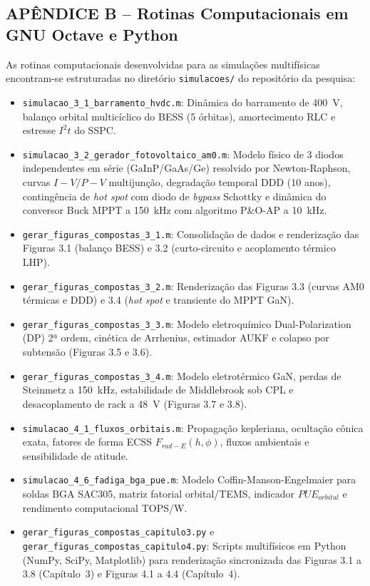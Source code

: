 \vspace{0.8cm}
\subsection*{APÊNDICE B -- Rotinas Computacionais em GNU Octave e Python}

As rotinas computacionais desenvolvidas para as simulações multifísicas encontram-se estruturadas no diretório \texttt{simulacoes/} do repositório da pesquisa:
\begin{itemize}[noitemsep,topsep=2pt,leftmargin=*]
    \item \texttt{simulacao\_3\_1\_barramento\_hvdc.m}: Dinâmica do barramento de 400~V, balanço orbital multicíclico do BESS (5 órbitas), amortecimento RLC e estresse $I^2t$ do SSPC.
    \item \texttt{simulacao\_3\_2\_gerador\_fotovoltaico\_am0.m}: Modelo físico de 3 diodos independentes em série (GaInP/GaAs/Ge) resolvido por Newton-Raphson, curvas $I-V/P-V$ multijunção, degradação temporal DDD (10 anos), contingência de \textit{hot spot} com diodo de \textit{bypass} Schottky e dinâmica do conversor Buck MPPT a 150~kHz com algoritmo P\&O-AP a 10~kHz.
    \item \texttt{gerar\_figuras\_compostas\_3\_1.m}: Consolidação de dados e renderização das Figuras 3.1 (balanço BESS) e 3.2 (curto-circuito e acoplamento térmico LHP).
    \item \texttt{gerar\_figuras\_compostas\_3\_2.m}: Renderização das Figuras 3.3 (curvas AM0 térmicas e DDD) e 3.4 (\textit{hot spot} e transiente do MPPT GaN).
    \item \texttt{gerar\_figuras\_compostas\_3\_3.m}: Modelo eletroquímico Dual-Polarization (DP) 2ª ordem, cinética de Arrhenius, estimador AUKF e colapso por subtensão (Figuras 3.5 e 3.6).
    \item \texttt{gerar\_figuras\_compostas\_3\_4.m}: Modelo eletrotérmico GaN, perdas de Steinmetz a 150~kHz, estabilidade de Middlebrook sob CPL e desacoplamento de rack a 48~V (Figuras 3.7 e 3.8).
    \item \texttt{simulacao\_4\_1\_fluxos\_orbitais.m}: Propagação kepleriana, ocultação cônica exata, fatores de forma ECSS $F_{rad-E}(h, \phi)$, fluxos ambientais e sensibilidade de atitude.
    \item \texttt{simulacao\_4\_6\_fadiga\_bga\_pue.m}: Modelo Coffin-Manson-Engelmaier para soldas BGA SAC305, matriz fatorial orbital/TEMS, indicador $PUE_{orbital}$ e rendimento computacional TOPS/W.
    \item \texttt{gerar\_figuras\_compostas\_capitulo3.py} e\\
    \texttt{gerar\_figuras\_compostas\_capitulo4.py}: Scripts multifísicos em Python (NumPy, SciPy, Matplotlib) para renderização sincronizada das Figuras 3.1 a 3.8 (Capítulo~3) e Figuras 4.1 a 4.4 (Capítulo~4).
\end{itemize}

